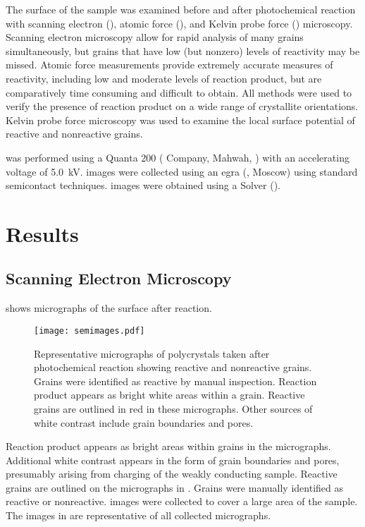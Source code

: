 The surface of the sample was examined before and after photochemical reaction with scanning electron (), atomic force (), and Kelvin probe force () microscopy. Scanning electron microscopy allow for rapid analysis of many grains simultaneously, but grains that have low (but nonzero) levels of reactivity may be missed. Atomic force measurements provide extremely accurate measures of reactivity, including low and moderate levels of reaction product, but are comparatively time consuming and difficult to obtain. All methods were used to verify the presence of reaction product on a wide range of crystallite orientations. Kelvin probe force microscopy was used to examine the local surface potential of reactive and nonreactive grains.

 was performed using a Quanta 200  ( Company, Mahwah, ) with an accelerating voltage of \SI{5.0}{\kilo\volt}.  images were collected using an egra  (, Moscow) using standard semicontact techniques.  images were obtained using a Solver  ().


\section{Results}
\label{sec:ch9results}


\subsection{Scanning Electron Microscopy}
\label{subsec:ch9sem}


 shows  micrographs of the  surface after reaction.
\begin{figure}
	\texttt{[image: semimages.pdf]}
	\caption[Representative  micrographs after photochemical reaction]{%
		Representative  micrographs of  polycrystals taken after photochemical reaction showing reactive and nonreactive grains. Grains were identified as 
		reactive by manual inspection. Reaction product appears as bright white areas within a grain. Reactive 
		grains are outlined in red in these micrographs. Other sources of white contrast include grain boundaries and 
		pores.}
	\label{fig:semimages}
\end{figure}
Reaction product appears as bright areas within grains in the  micrographs. Additional white contrast appears in the form of grain boundaries and pores, presumably arising from charging of the weakly conducting sample. Reactive grains are outlined on the micrographs in . Grains were manually identified as reactive or nonreactive.  images were collected to cover a large area of the sample. The images in  are representative of all collected micrographs.

